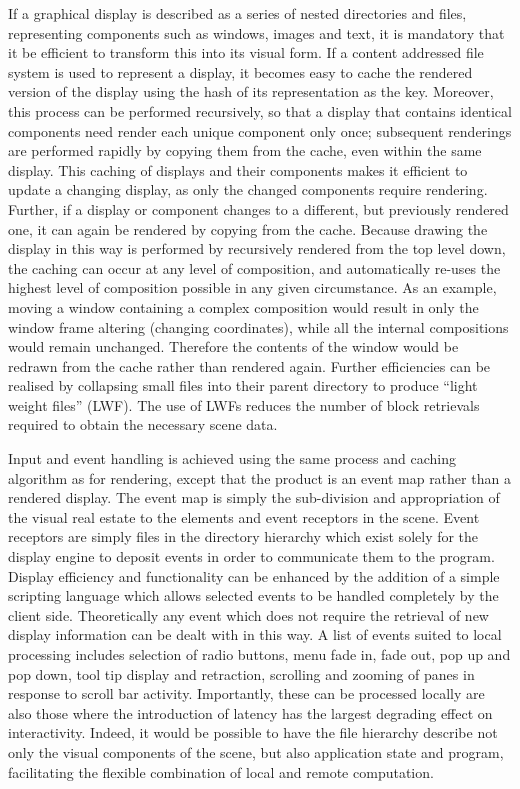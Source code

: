 \documentclass[british,english]{article}
\begin{document}
If a graphical display is described as a series of nested directories
and files, representing components such as windows, images and text,
it is mandatory that it be efficient to transform this into its visual
form. If a content addressed file system is used to represent a display,
it becomes easy to cache the rendered version of the display using
the hash of its representation as the key. Moreover, this process
can be performed recursively, so that a display that contains identical
components need render each unique component only once; subsequent
renderings are performed rapidly by copying them from the cache, even
within the same display. This caching of displays and their components
makes it efficient to update a changing display, as only the changed
components require rendering. Further, if a display or component changes
to a different, but previously rendered one, it can again be rendered
by copying from the cache. Because drawing the display in this way
is performed by recursively rendered from the top level down, the
caching can occur at any level of composition, and automatically re-uses
the highest level of composition possible in any given circumstance.
As an example, moving a window containing a complex composition would
result in only the window frame altering (changing coordinates), while
all the internal compositions would remain unchanged. Therefore the
contents of the window would be redrawn from the cache rather than
rendered again. Further efficiencies can be realised by collapsing
small files into their parent directory to produce {}``light weight
files'' (LWF). The use of LWFs reduces the number of block retrievals
required to obtain the necessary scene data. 

Input and event handling is achieved using the same process and caching
algorithm as for rendering, except that the product is an event map
rather than a rendered display. The event map is simply the sub-division
and appropriation of the visual real estate to the elements and event
receptors in the scene. Event receptors are simply files in the directory
hierarchy which exist solely for the display engine to deposit events
in order to communicate them to the program. Display efficiency and
functionality can be enhanced by the addition of a simple scripting
language which allows selected events to be handled completely by
the client side. Theoretically any event which does not require the
retrieval of new display information can be dealt with in this way.
A list of events suited to local processing includes selection of
radio buttons, menu fade in, fade out, pop up and pop down, tool tip
display and retraction, scrolling and zooming of panes in response
to scroll bar activity. Importantly, these can be processed locally
are also those where the introduction of latency has the largest degrading
effect on interactivity. Indeed, it would be possible to have the
file hierarchy describe not only the visual components of the scene,
but also application state and program, facilitating the flexible
combination of local and remote computation.
\end{document}
